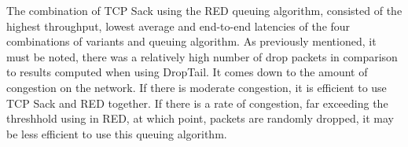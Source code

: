 The combination of TCP Sack using the RED queuing algorithm, consisted of the highest throughput, lowest average and end-to-end latencies of the four combinations of variants and queuing algorithm. As previously mentioned, it must be noted, there was a relatively high number of drop packets in comparison to results computed when using DropTail. It comes down to the amount of congestion on the network. If there is moderate congestion, it is efficient to use TCP Sack and RED together. If there is a rate of congestion, far exceeding the threshhold using in RED, at which point, packets are randomly dropped, it may be less efficient to use this queuing algorithm.